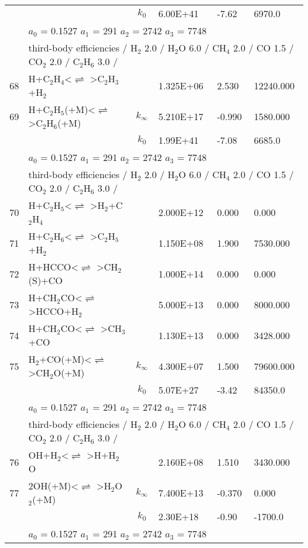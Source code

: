 \documentclass[11pt]{article}
\begin{document}
\begin{table}[hbt]
\begin{tabular}{|r l c l l l|}
	&	&	$k_0$&	6.00E+41&-7.62&	 6970.0\\ 
	&\multicolumn{5}{l|}{	$a_0$ = 0.1527	$a_1$ = 291	$a_2$ = 2742	$a_3$ = 7748}\\ 
	&\multicolumn{5}{l|}{third-body efficiencies  / H$_{2}$ 2.0 / H$_{2}$O 6.0 / CH$_{4}$ 2.0 / CO 1.5 / CO$_{2}$ 2.0 / C$_{2}$H$_{6}$ 3.0 /}\\ 
68 &	H+C$_{2}$H$_{4}$<$\rightleftharpoons$ >C$_{2}$H$_{3}$+H$_{2}$&	&	1.325E+06&	2.530&	12240.000\\ 
69 &	H+C$_{2}$H$_{5}$(+M)<$\rightleftharpoons$ >C$_{2}$H$_{6}$(+M)&	$k_{\infty}$&	5.210E+17&	-0.990&	1580.000\\ 
	&	&	$k_0$&	1.99E+41&-7.08&	 6685.0\\ 
	&\multicolumn{5}{l|}{	$a_0$ = 0.1527	$a_1$ = 291	$a_2$ = 2742	$a_3$ = 7748}\\ 
	&\multicolumn{5}{l|}{third-body efficiencies  / H$_{2}$ 2.0 / H$_{2}$O 6.0 / CH$_{4}$ 2.0 / CO 1.5 / CO$_{2}$ 2.0 / C$_{2}$H$_{6}$ 3.0 /}\\ 
70 &	H+C$_{2}$H$_{5}$<$\rightleftharpoons$ >H$_{2}$+C$_{2}$H$_{4}$&	&	2.000E+12&	0.000&	0.000\\ 
71 &	H+C$_{2}$H$_{6}$<$\rightleftharpoons$ >C$_{2}$H$_{5}$+H$_{2}$&	&	1.150E+08&	1.900&	7530.000\\ 
72 &	H+HCCO<$\rightleftharpoons$ >CH$_{2}$(S)+CO&	&	1.000E+14&	0.000&	0.000\\ 
73 &	H+CH$_{2}$CO<$\rightleftharpoons$ >HCCO+H$_{2}$&	&	5.000E+13&	0.000&	8000.000\\ 
74 &	H+CH$_{2}$CO<$\rightleftharpoons$ >CH$_{3}$+CO&	&	1.130E+13&	0.000&	3428.000\\ 
75 &	H$_{2}$+CO(+M)<$\rightleftharpoons$ >CH$_{2}$O(+M)&	$k_{\infty}$&	4.300E+07&	1.500&	79600.000\\ 
	&	&	$k_0$&	5.07E+27&-3.42&	84350.0\\ 
	&\multicolumn{5}{l|}{	$a_0$ = 0.1527	$a_1$ = 291	$a_2$ = 2742	$a_3$ = 7748}\\ 
	&\multicolumn{5}{l|}{third-body efficiencies  / H$_{2}$ 2.0 / H$_{2}$O 6.0 / CH$_{4}$ 2.0 / CO 1.5 / CO$_{2}$ 2.0 / C$_{2}$H$_{6}$ 3.0 /}\\ 
76 &	OH+H$_{2}$<$\rightleftharpoons$ >H+H$_{2}$O&	&	2.160E+08&	1.510&	3430.000\\ 
77 &	2OH(+M)<$\rightleftharpoons$ >H$_{2}$O$_{2}$(+M)&	$k_{\infty}$&	7.400E+13&	-0.370&	0.000\\ 
	&	&	$k_0$&	2.30E+18&-0.90&	-1700.0\\ 
	&\multicolumn{5}{l|}{	$a_0$ = 0.1527	$a_1$ = 291	$a_2$ = 2742	$a_3$ = 7748}\\ 

\end{tabular}
\end{table}
\end{document}
